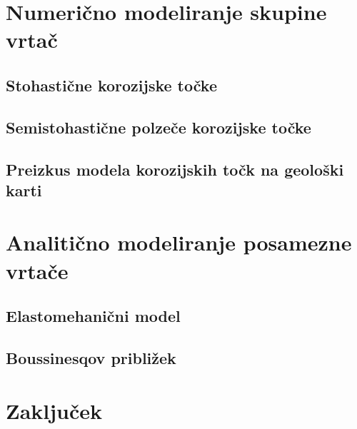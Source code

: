\documentclass[a4paper, oneside, 12pt]{book}
\begin{document}
\chapter{Numerično modeliranje skupine vrtač}
\label{ch2}

\section{Stohastične korozijske točke}
\section{Semistohastične polzeče korozijske točke}
\section{Preizkus modela korozijskih točk na geološki karti}


\chapter{Analitično modeliranje posamezne vrtače}
\label{ch3}

\section{Elastomehanični model}
\section{Boussinesqov približek}



\chapter{Zaključek}



\nocite{*}
\newpage
{}

\end{document}
